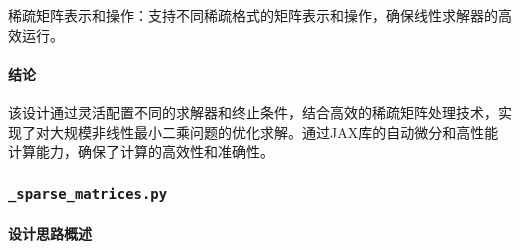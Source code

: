 \documentclass{ctexart}
\begin{document}
稀疏矩阵表示和操作：支持不同稀疏格式的矩阵表示和操作，确保线性求解器的高效运行。

\paragraph{结论}

该设计通过灵活配置不同的求解器和终止条件，结合高效的稀疏矩阵处理技术，实现了对大规模非线性最小二乘问题的优化求解。通过JAX库的自动微分和高性能计算能力，确保了计算的高效性和准确性。

\subsubsection{\texttt{\_sparse\_matrices.py}}

\paragraph{设计思路概述}
\end{document}
